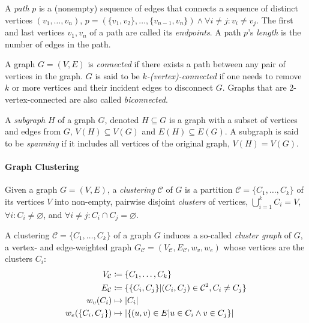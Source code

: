 A \emph{path} $p$ is a (nonempty) sequence of edges that connects a sequence of distinct vertices $(v_1, \dots, v_n)$, \ie{} $p = (\{v_1, v_2\}, \dots, \{v_{n-1},v_n\}) \land \forall i \neq j \colon v_i \neq v_j$.
The first and last vertices $v_1, v_n$ of a path are called its \emph{endpoints}.
A path $p$'s \emph{length} is the number of edges in the path.

A graph $G = (V, E)$ is \emph{connected} if there exists a path between any pair of vertices in the graph.
$G$ is said to be \emph{$k$-(vertex)-connected} if one needs to remove $k$ or more vertices and their incident edges to disconnect $G$.
Graphs that are 2-vertex-connected are also called \emph{biconnected}.

A \emph{subgraph} $H$ of a graph $G$, denoted $H \subseteq G$ is a graph with a subset of vertices and edges from $G$, \ie{} $V(H) \subseteq V(G)$ and $E(H) \subseteq E(G)$.
A subgraph is said to be \emph{spanning} if it includes all vertices of the original graph, \ie{} $V(H) = V(G)$.


\paragraph{Graph Clustering}

Given a graph $G = (V, E)$, a \emph{clustering} $\mathcal{C}$ of $G$ is a partition $\mathcal{C} = \{C_1, \dots, C_k\}$ of its vertices $V$ into non-empty, pairwise disjoint \emph{clusters} of vertices, \ie{} $\bigcup_{i=1}^k C_i = V$, $\forall i \colon C_i \neq \varnothing$, and $\forall i \neq j \colon C_i \cap C_j = \varnothing$.

A clustering $\mathcal{C} = \{ C_1, \dots, C_k \}$ of a graph $G$ induces a so-called \emph{cluster graph} of $G$, a vertex- and edge-weighted graph $G_\mathcal{C} = (V_\mathcal{C}, E_\mathcal{C}, w_v, w_e)$ whose vertices are the clusters $C_i$:
%
\begin{align*}
V_\mathcal{C} &\coloneqq \{ C_1, \dots, C_k \} \\
E_\mathcal{C} &\coloneqq \{ \{C_i, C_j\} \vert (C_i, C_j) \in \mathcal{C}^2, C_i \neq C_j \} \\
w_v(C_i) &\mapsto \left\lvert C_i\right\rvert \\
w_e(\{C_i, C_j\}) &\mapsto \left\lvert\{ (u,v) \in E \vert u \in C_i \land v \in C_j \}\right\rvert
\end{align*}



